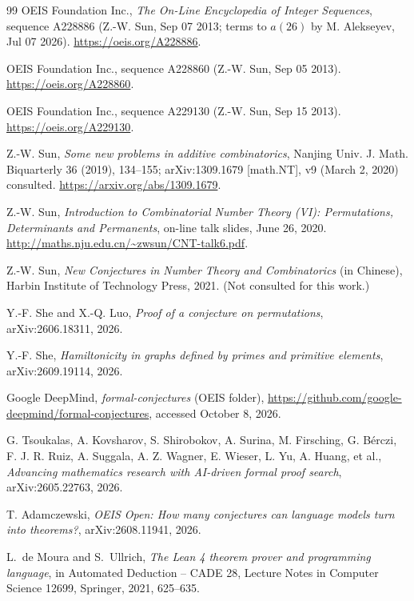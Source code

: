 \documentclass[11pt]{article}
\numberwithin{equation}{section}
\theoremstyle{definition}
\theoremstyle{remark}
\begin{document}
\begin{thebibliography}{99}
OEIS Foundation Inc., \emph{The On-Line Encyclopedia of Integer Sequences}, sequence A228886
(Z.-W. Sun, Sep 07 2013; terms to $a(26)$ by M. Alekseyev, Jul 07 2026).
\url{https://oeis.org/A228886}.

OEIS Foundation Inc., sequence A228860 (Z.-W. Sun, Sep 05 2013).
\url{https://oeis.org/A228860}.

OEIS Foundation Inc., sequence A229130 (Z.-W. Sun, Sep 15 2013).
\url{https://oeis.org/A229130}.

Z.-W. Sun, \emph{Some new problems in additive combinatorics}, Nanjing Univ. J. Math. Biquarterly
36 (2019), 134--155; arXiv:1309.1679 [math.NT], v9 (March 2, 2020) consulted.
\url{https://arxiv.org/abs/1309.1679}.

Z.-W. Sun, \emph{Introduction to Combinatorial Number Theory (VI): Permutations, Determinants and
Permanents}, on-line talk slides, June 26, 2020.
\url{http://maths.nju.edu.cn/~zwsun/CNT-talk6.pdf}.

Z.-W. Sun, \emph{New Conjectures in Number Theory and Combinatorics} (in Chinese), Harbin Institute
of Technology Press, 2021. (Not consulted for this work.)

Y.-F. She and X.-Q. Luo, \emph{Proof of a conjecture on permutations}, arXiv:2606.18311, 2026.

Y.-F. She, \emph{Hamiltonicity in graphs defined by primes and primitive elements},
arXiv:2609.19114, 2026.

Google DeepMind, \emph{formal-conjectures} (OEIS folder),
\url{https://github.com/google-deepmind/formal-conjectures}, accessed October 8, 2026.

G. Tsoukalas, A. Kovsharov, S. Shirobokov, A. Surina, M. Firsching, G. B\'erczi, F. J. R. Ruiz,
A. Suggala, A. Z. Wagner, E. Wieser, L. Yu, A. Huang, et al., \emph{Advancing mathematics research
with AI-driven formal proof search}, arXiv:2605.22763, 2026.

T. Adamczewski, \emph{OEIS Open: How many conjectures can language models turn into theorems?},
arXiv:2608.11941, 2026.

L.~de Moura and S.~Ullrich, \emph{The Lean 4 theorem prover and programming language}, in
Automated Deduction -- CADE 28, Lecture Notes in Computer Science 12699, Springer, 2021, 625--635.
\end{thebibliography}
\end{document}
